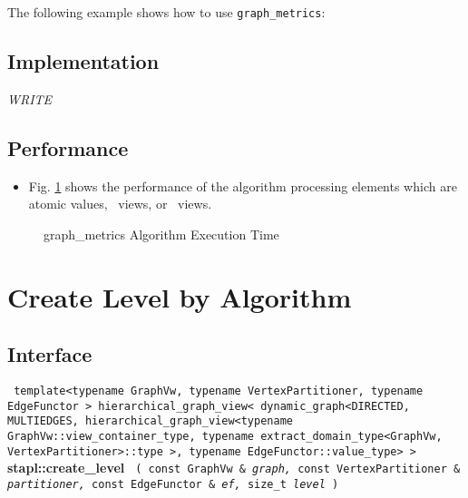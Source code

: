 The following example shows how to use 
\texttt{graph\_metrics}:


\subsection{Implementation} \label{sec-graf-metrics-alg-impl}

\textit{WRITE}

\subsection{Performance} \label{sec-graf-metrics-alg-perf}

\begin{itemize}
\item
Fig. \ref{fig:graf-metrics-alg-exec-exper}
shows the performance of the algorithm processing
elements which are atomic values, \stl\ views, or \stapl\ views.
\end{itemize}

\begin{figure}[p]
\caption{ graph\_metrics Algorithm Execution Time}
\label{fig:graf-metrics-alg-exec-exper}
\end{figure}


\section{ Create Level by Algorithm}
\label{sec-create-level-user-alg}

\subsection{Interface} \label{sec-create-level-user-alg-inter}

\noindent
\texttt{%
template<typename GraphVw, typename VertexPartitioner, typename EdgeFunctor >
\newline
hierarchical\_graph\_view< dynamic\_graph<DIRECTED, MULTIEDGES, 
\newline
hierarchical\_graph\_view<typename GraphVw::view\_container\_type, 
\newline
typename extract\_domain\_type<GraphVw, VertexPartitioner>::type >, 
\newline
typename EdgeFunctor::value\_type> > 
}
\newline
\textbf{stapl::create\_level}%
\newline
\texttt{%
(
const GraphVw \&
\textit{graph,}%
const VertexPartitioner \&
\textit{partitioner,}%
const EdgeFunctor \&
\textit{ef,}%
size\_t
\textit{level}%
)     
}
\vspace{0.4cm}

